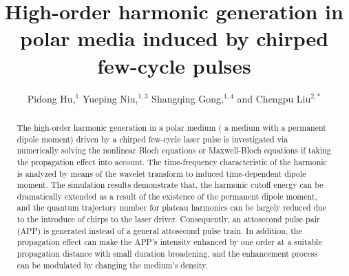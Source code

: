\documentclass[10pt,letterpaper]{article}
\begin{document}
\title{High-order harmonic generation in polar media induced by chirped few-cycle pulses}

\author{Pidong Hu,$^1$ Yueping Niu,$^{1,3}$ Shangqing Gong,$^{1,4}$  and Chengpu Liu$^{2,*}$}

\address{$^1$Department of Physics, East China University of Science and Technology, \\
Meilong Road 130, Shanghai 200237, China\\
$^2$State Key Laboratory of High Field Laser Physics, Shanghai Institute of Optics and Fine Mechanics, Chinese Academy of Sciences, Qinghe Road 390, Shanghai 201800, China\\
$^{3}$niuyp@ecust.edu.cn\\
$^{4}$sqgong@ecust.edu.cn
}




\begin{abstract}
The high-order harmonic generation in a polar medium ( a medium with a permanent dipole moment) driven by a chirped few-cycle laser pulse is investigated via numerically solving the nonlinear Bloch equations or Maxwell-Bloch equations if taking the propagation effect into account. The time-frequency characteristic of the harmonic is analyzed by means of the wavelet transform to induced time-dependent dipole moment. The simulation results demonstrate that, the harmonic cutoff energy can be dramatically extended as a result of the existence of the permanent dipole moment, and the quantum trajectory number for plateau harmonics can be largely reduced due to the introduce of chirps to the laser driver. Consequently, an attosecond pulse pair (APP) is generated instead of a general attosecond pulse train. In addition, the propagation effect can make the APP's intensity enhanced by one order at a suitable propagation distance with small duration broadening, and the enhancement process can be modulated by changing the medium's density.
\end{abstract}

\end{document}
